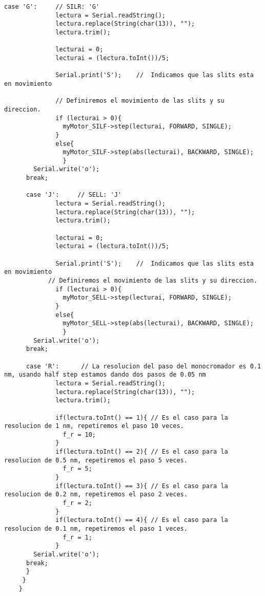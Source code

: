 \begin{lstlisting}[style=Arduino]
      case 'G':     // SILR: 'G'
              lectura = Serial.readString();
              lectura.replace(String(char(13)), "");
              lectura.trim();
              
              lecturai = 0;
              lecturai = (lectura.toInt())/5;
              
              Serial.print('S');    //  Indicamos que las slits esta en movimiento
              
              // Definiremos el movimiento de las slits y su direccion.
              if (lecturai > 0){
                myMotor_SILF->step(lecturai, FORWARD, SINGLE);
              }
              else{
                myMotor_SILF->step(abs(lecturai), BACKWARD, SINGLE);
                }
        Serial.write('o');
      break;
    
      case 'J':     // SELL: 'J'
              lectura = Serial.readString();
              lectura.replace(String(char(13)), "");
              lectura.trim();
              
              lecturai = 0;
              lecturai = (lectura.toInt())/5;
              
              Serial.print('S');    //  Indicamos que las slits esta en movimiento
            // Definiremos el movimiento de las slits y su direccion.
              if (lecturai > 0){
                myMotor_SELL->step(lecturai, FORWARD, SINGLE);
              }
              else{
                myMotor_SELL->step(abs(lecturai), BACKWARD, SINGLE);
                }
        Serial.write('o');
      break;
      
      case 'R':      // La resolucion del paso del monocromador es 0.1 nm, usando half step estamos dando dos pasos de 0.05 nm
              lectura = Serial.readString();
              lectura.replace(String(char(13)), "");
              lectura.trim();
    
              if(lectura.toInt() == 1){ // Es el caso para la resolucion de 1 nm, repetiremos el paso 10 veces.
                f_r = 10;
              }
              if(lectura.toInt() == 2){ // Es el caso para la resolucion de 0.5 nm, repetiremos el paso 5 veces.
                f_r = 5;
              }
              if(lectura.toInt() == 3){ // Es el caso para la resolucion de 0.2 nm, repetiremos el paso 2 veces.
                f_r = 2;
              }
              if(lectura.toInt() == 4){ // Es el caso para la resolucion de 0.1 nm, repetiremos el paso 1 veces.
                f_r = 1;
              }
        Serial.write('o');
      break;
      }
     }
    }
\end{lstlisting}